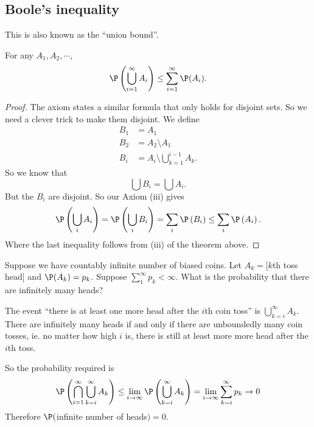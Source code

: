 \documentclass[a4paper]{article}
\begin{document}
\subsection{Boole's inequality}
This is also known as the ``union bound''.
\begin{thm}
  For any $A_1, A_2, \cdots$,
  \[
    \P\left(\bigcup_{i = 1}^\infty A_i\right) \leq \sum_{i = 1}^\infty \P(A_i).
  \]
\end{thm}

\begin{proof}
  The axiom states a similar formula that only holds for disjoint sets. So we need a clever trick to make them disjoint. We define
  \begin{align*}
    B_1 &= A_1\\
    B_2 &= A_2\setminus A_1\\
    B_i &= A_i\setminus \bigcup_{k = 1}^{i -1 }A_k.
  \end{align*}
  So we know that
  \[
    \bigcup B_i = \bigcup A_i.
  \]
  But the $B_i$ are disjoint. So our Axiom (iii) gives
  \[
    \P\left(\bigcup_i A_i\right) = \P\left(\bigcup _i B_i\right) = \sum_i \P\left(B_i\right) \leq \sum_i \P\left(A_i\right).
  \]
  Where the last inequality follows from (iii) of the theorem above.
\end{proof}

\begin{eg}
  Suppose we have countably infinite number of biased coins. Let $A_k = [k$th toss head$]$ and $\P(A_k) = p_k$. Suppose $\sum_1^\infty p_k < \infty$. What is the probability that there are infinitely many heads?

  The event ``there is at least one more head after the $i$th coin toss'' is $\bigcup_{k = i}^\infty A_k$. There are infinitely many heads if and only if there are unboundedly many coin tosses, ie. no matter how high $i$ is, there is still at least more more head after the $i$th toss.

  So the probability required is
  \[
    \P\left(\bigcap_{i = 1}^\infty\bigcup _{k = i}^\infty A_k\right) \leq \lim_{i \to \infty} \P\left(\bigcup_{k = i}^\infty A_k\right)= \lim_{i\to \infty}\sum_{k = i}^\infty p_k \to 0
  \]
  Therefore $\P($infinite number of heads$) = 0$.
\end{eg}
\end{document}
